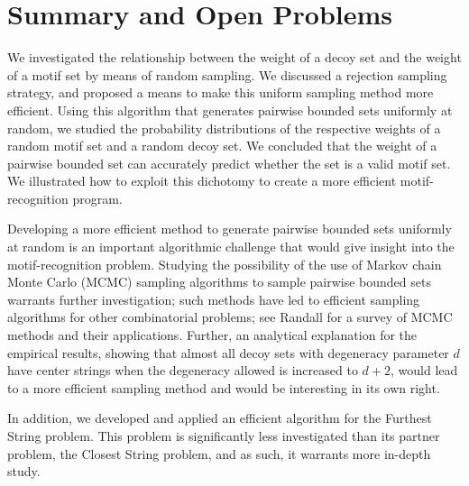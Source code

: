\section{Summary and Open Problems}

We investigated the relationship between the weight of a decoy set and the weight of a motif set by means of random sampling. We discussed a rejection sampling strategy, and proposed a means to make this uniform sampling method more efficient. Using this algorithm that generates pairwise bounded sets uniformly at random, we studied the probability distributions of the respective weights of a random motif set and a random decoy set.  We concluded that the weight of a pairwise bounded set can accurately predict whether the set is a valid motif set.  We illustrated how to exploit this dichotomy to create a more efficient motif-recognition program.  

Developing a more efficient method to generate pairwise bounded sets uniformly at random is an important algorithmic challenge that would give insight into the motif-recognition problem. Studying the possibility of the use of Markov chain Monte Carlo (MCMC) sampling algorithms to sample pairwise bounded sets warrants further investigation; such methods have led to efficient sampling algorithms for other combinatorial problems; see Randall \cite{randall} for a survey of MCMC methods and their applications.  Further, an analytical explanation for the empirical results, showing that almost all decoy sets with degeneracy parameter $d$ have center strings when the degeneracy allowed is increased to $d + 2$, would lead to a more efficient sampling method and would be interesting in its own right.

In addition, we developed and applied an efficient algorithm for the {\sc Furthest String} problem.  This problem is significantly less investigated than its partner problem, the {\sc Closest String} problem, and as such, it warrants more in-depth study. 
